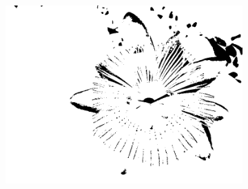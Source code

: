 \documentclass{article}
\begin{document}
\begin{figure}[H]
\begin{subfigure}{.3\textwidth}
  \includegraphics[width=0.97\linewidth]{_Figures/sample_2_bad_treshold.png}
    \caption{}
  \label{fig:tresh_bad_2}
\end{subfigure}


\end{figure}
\end{document}

